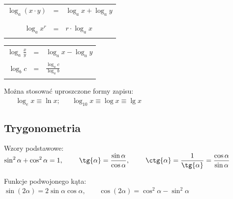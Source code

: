 \documentclass[10pt, twoside, fleqn]{article}
\begin{document}
		\begin{multicols}{2}				
		\begin{tabular}{rcl}
			$\displaystyle \log_a{(x \cdot y)}$	&=& $\log_a{x} + \log_a{y}$	 \\ \\ \\		
			$\displaystyle \log_a{x^r}$			&=& $r \cdot \log_a{x}$			\\ \\		
		\end{tabular}
		
		\begin{tabular}{rcl}		
			$\displaystyle \log_a{\frac{x}{y}}$	&=& $\log_a{x} - \log_a{y}$		\\ \\					$\displaystyle \log_b{c}$			&=& $\displaystyle \frac{\log_a{c}}{\log_a{b}}$		\\ \\		
		\end{tabular}		
		\end{multicols}
		
		Można stosować uproszczone formy zapisu:
		$ \displaystyle \hspace{20pt} \log_e{x} \equiv \ln{x}; 
						\hspace{20pt} \log_{10}{x} \equiv \log{x}	\equiv \lg{x} $
		\\		

	\subsection{Trygonometria}	

		\hspace{10pt} Wzory podstawowe: \hspace{51pt}
		$ \displaystyle	\sin^2{\alpha} + \cos^2{\alpha} = 1,		\hspace{23pt}		
					\tg{\alpha} = \frac{\sin{\alpha}}{\cos{\alpha}},\hspace{23pt}
					\ctg{\alpha} = \frac{1}{\tg{\alpha}} 
								= \frac{\cos{\alpha}}{\sin{\alpha}}
		$\\
		\vspace{10pt}	
		
		
		Funkcje podwojonego kąta: \hspace{17pt}
		$ \displaystyle	\sin{(2\alpha)} = 2 \sin{\alpha}\cos{\alpha},	\hspace{23pt}		
					    \cos{(2\alpha)} = \cos^2{\alpha} - \sin^2{\alpha}
		$
		\vspace{10pt}	
		
\end{document}
